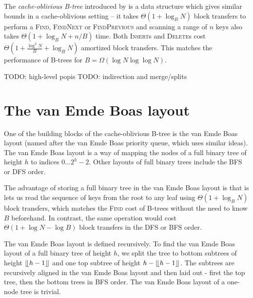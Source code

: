 The \textit{cache-oblivious B-tree} introduced by \cite{demaine00}
is a data structure which gives similar bounds in a cache-oblivious
setting -- it takes $\Theta(1+\log_B N)$ block transfers to perform
a \textsc{Find}, \textsc{FindNext} or \textsc{FindPrevious} and scanning
a range of $n$ keys also takes $\Theta(1+\log_B N+n/B)$ time.
Both \textsc{Insert}s and \textsc{Delete}s cost
$\Theta(1+\frac{\log^2 N}{B}+\log_B N)$ amortized block transfers.
This matches the performance of B-trees for $B=\Omega(\log N\log\log N)$.

TODO: high-level popis
TODO: indirection and merge/splits


\section{The van Emde Boas layout}
One of the building blocks of the cache-oblivious B-tree is the van Emde Boas
layout (named after the van Emde Boas priority queue, which uses similar ideas).
The van Emde Boas layout is a way of mapping the nodes of a full binary
tree of height $h$ to indices $0\ldots 2^h-2$. Other layouts of full binary
trees include the BFS or DFS order.

The advantage of storing a full binary tree in the van Emde Boas layout
is that is lets us read the sequence of keys from the root to any leaf
using $\Theta(1+\log_B N)$ block transfers, which matches the \textsc{Find}
cost of B-trees without the need to know $B$ beforehand.
In contrast, the same operation would cost $\Theta(1+\log N-\log B)$ block
transfers in the DFS or BFS order.

The van Emde Boas layout is defined recursively. To find the van Emde Boas layout
of a full binary tree of height $h$, we split the tree to bottom subtrees
of height $\lfloor \kern -0.22em \lfloor h-1 \rfloor \kern -0.22em \rfloor$ and one top subtree of height $h - \lfloor \kern -0.22em \lfloor
h-1 \rfloor \kern -0.22em \rfloor$.
The subtrees are recursively aligned in the van Emde Boas layout and then laid
out - first the top tree, then the bottom trees in BFS order. The van Emde Boas
layout of a one-node tree is trivial.

